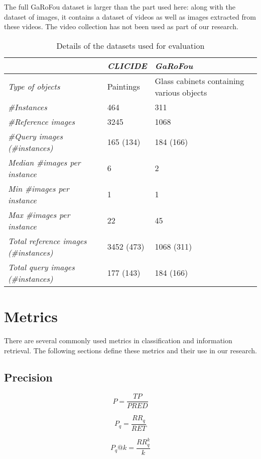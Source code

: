 The full GaRoFou dataset is larger than the part used here: along with
the dataset of images, it contains a dataset of videos as well as images
extracted from these videos. The video collection has not been used as
part of our research.

\begin{table}
\begin{tabular}{|l|l|l|}
\hline & \emph{CLICIDE} & \emph{GaRoFou}\\
\hline \emph{Type of objects} & Paintings & Glass cabinets
containing various objects\\
\hline \emph{\#Instances} & 464 & 311\\
\hline \emph{\#Reference images} & 3245 & 1068\\
\hline \emph{\#Query images (\#instances)} & 165 (134) & 184 (166)\\
\hline \emph{Median \#images per instance} & 6 & 2\\
\hline \emph{Min \#images per instance} & 1 & 1\\
\hline \emph{Max \#images per instance} & 22 & 45\\
\hline \emph{Total reference images (\#instances)} & 3452 (473) & 1068 (311)\\
\hline \emph{Total query images (\#instances)} & 177 (143) & 184 (166)\\
\hline
\end{tabular}
\caption{Details of the datasets used for evaluation\label{tab:datasets}}
\end{table}

\section{Metrics}
There are several commonly used metrics in classification and information
retrieval. The following sections define these metrics and their use
in our research.

\subsection{Precision}\label{sec:precision}
\begin{equation}\label{eq:preccls}
P = \frac{TP}{PRED}
\end{equation}

\begin{equation}\label{eq:precir}
P_q = \frac{RR_q}{RET}
\end{equation}

\begin{equation}\label{eq:preck}
P_q@k = \frac{RR^k_q}{k}
\end{equation}

